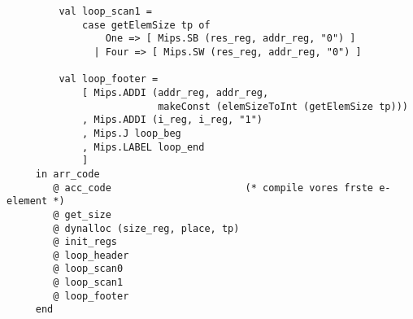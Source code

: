 \documentclass{article}
\begin{document}
\begin{lstlisting}
         val loop_scan1 =
             case getElemSize tp of
                 One => [ Mips.SB (res_reg, addr_reg, "0") ]
               | Four => [ Mips.SW (res_reg, addr_reg, "0") ]

         val loop_footer =
             [ Mips.ADDI (addr_reg, addr_reg,
                          makeConst (elemSizeToInt (getElemSize tp)))
             , Mips.ADDI (i_reg, i_reg, "1")
             , Mips.J loop_beg
             , Mips.LABEL loop_end
             ]
     in arr_code
        @ acc_code                       (* compile vores frste e-element *)
        @ get_size
        @ dynalloc (size_reg, place, tp)
        @ init_regs
        @ loop_header
        @ loop_scan0
        @ loop_scan1
        @ loop_footer
     end	
\end{lstlisting}
\end{document}
